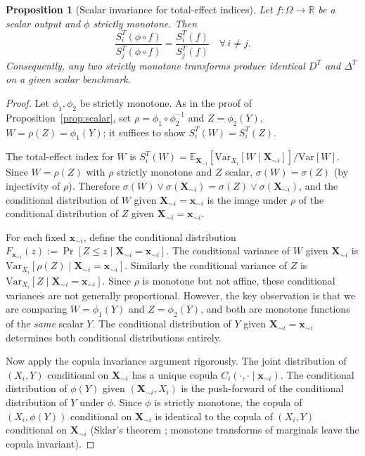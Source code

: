 \documentclass[11pt,onecolumn]{article}
\newtheorem{proposition}{Proposition}
\begin{document}
\begin{proposition}[Scalar invariance for total-effect indices]
\label{prop:scalar_T}
Let $f: \Omega \to \mathbb{R}$ be a scalar output and $\phi$ strictly monotone.
Then
\[
  \frac{S_i^T(\phi \circ f)}{S_j^T(\phi \circ f)}
  = \frac{S_i^T(f)}{S_j^T(f)}
  \quad \forall\, i \neq j.
\]
Consequently, any two strictly monotone transforms produce identical $D^T$
and $\Delta^T$ on a given scalar benchmark.
\end{proposition}

\begin{proof}
Let $\phi_1, \phi_2$ be strictly monotone.  As in the proof of
Proposition~\ref{prop:scalar}, set $\rho = \phi_1 \circ \phi_2^{-1}$ and
$Z = \phi_2(Y)$, $W = \rho(Z) = \phi_1(Y)$; it suffices to show
$S_i^T(W) = S_i^T(Z)$.

The total-effect index for $W$ is
$S_i^T(W) = \mathbb{E}_{\mathbf{X}_{\sim i}}[\mathrm{Var}_{X_i}[W \mid \mathbf{X}_{\sim i}]] / \mathrm{Var}[W]$.
Since $W = \rho(Z)$ with $\rho$ strictly monotone and $Z$ scalar,
$\sigma(W) = \sigma(Z)$ (by injectivity of $\rho$).  Therefore
$\sigma(W) \vee \sigma(\mathbf{X}_{\sim i}) = \sigma(Z) \vee \sigma(\mathbf{X}_{\sim i})$,
and the conditional distribution of $W$ given $\mathbf{X}_{\sim i} = \mathbf{x}_{\sim i}$
is the image under $\rho$ of the conditional distribution of $Z$ given
$\mathbf{X}_{\sim i} = \mathbf{x}_{\sim i}$.

For each fixed $\mathbf{x}_{\sim i}$, define the conditional distribution
$F_{\mathbf{x}_{\sim i}}(z) := \Pr[Z \leq z \mid \mathbf{X}_{\sim i} = \mathbf{x}_{\sim i}]$.
The conditional variance of $W$ given $\mathbf{X}_{\sim i}$ is
$\mathrm{Var}_{X_i}[\rho(Z) \mid \mathbf{X}_{\sim i} = \mathbf{x}_{\sim i}]$.
Similarly the conditional variance of $Z$ is
$\mathrm{Var}_{X_i}[Z \mid \mathbf{X}_{\sim i} = \mathbf{x}_{\sim i}]$.
Since $\rho$ is monotone but not affine, these conditional variances are
not generally proportional.  However, the key observation is that we are
comparing $W = \phi_1(Y)$ and $Z = \phi_2(Y)$, and both are monotone
functions of the \emph{same} scalar $Y$.  The conditional distribution of $Y$
given $\mathbf{X}_{\sim i} = \mathbf{x}_{\sim i}$ determines both
conditional distributions entirely.

Now apply the copula invariance argument rigorously.  The joint distribution
of $(X_i, Y)$ conditional on $\mathbf{X}_{\sim i}$ has a unique copula
$C_i(\cdot, \cdot \mid \mathbf{x}_{\sim i})$.  The conditional distribution
of $\phi(Y)$ given $(\mathbf{X}_{\sim i}, X_i)$ is the push-forward of the
conditional distribution of $Y$ under $\phi$.  Since $\phi$ is strictly
monotone, the copula of $(X_i, \phi(Y))$ conditional on $\mathbf{X}_{\sim i}$
is identical to the copula of $(X_i, Y)$ conditional on $\mathbf{X}_{\sim i}$
(Sklar's theorem \citep{Sklar1959}; monotone transforms of marginals leave the copula invariant).


\end{proof}
\end{document}
